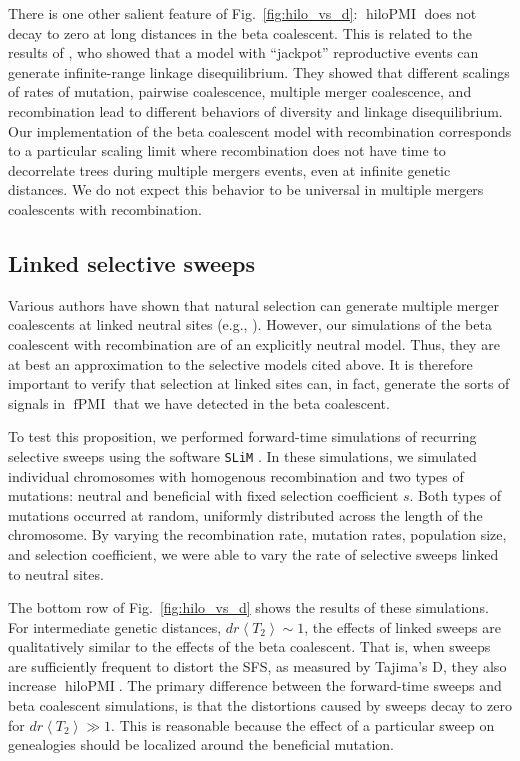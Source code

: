 \documentclass[11pt, letterpaper]{article}   	%
\newcommand{\fig}[1]{Fig.~\ref{#1}}
\newcommand{\E}[1]{\left< #1 \right>}
\DeclareMathOperator{\fpmi}{fPMI}
\DeclareMathOperator{\hilopmi}{hiloPMI}
\begin{document}
There is one other salient feature of \fig{fig:hilo_vs_d}: $\hilopmi$ does not decay to zero at long distances in the beta coalescent.
This is related to the results of \cite{EldonWakeley20??}, who showed that a model with ``jackpot'' reproductive events can generate infinite-range linkage disequilibrium.
They showed that different scalings of rates of mutation, pairwise coalescence, multiple merger coalescence, and recombination lead to different behaviors of diversity and linkage disequilibrium.
Our implementation of the beta coalescent model with recombination corresponds to a particular scaling limit where recombination does not have time to decorrelate trees during multiple mergers events, even at infinite genetic distances.
We do not expect this behavior to be universal in multiple mergers coalescents with recombination.

\subsection*{Linked selective sweeps}

Various authors have shown that natural selection can generate multiple merger coalescents at linked neutral sites (e.g., \cite{DurrettSchweinsberg2005, CoopRalph, NeherHallatscheck2013, DesaiEtAl, Seger}).
However, our simulations of the beta coalescent with recombination are of an explicitly neutral model.
Thus, they are at best an approximation to the selective models cited above.
It is therefore important to verify that selection at linked sites can, in fact, generate the sorts of signals in $\fpmi$ that we have detected in the beta coalescent.

To test this proposition, we performed forward-time simulations of recurring selective sweeps using the software \texttt{SLiM} \autocite{MesserEtAl201?}.
In these simulations, we simulated individual chromosomes with homogenous recombination and two types of mutations: neutral and beneficial with fixed selection coefficient $s$.
Both types of mutations occurred at random, uniformly distributed across the length of the chromosome.
By varying the recombination rate, mutation rates, population size, and selection coefficient, we were able to vary the rate of selective sweeps linked to neutral sites.

The bottom row of \fig{fig:hilo_vs_d} shows the results of these simulations.
For intermediate genetic distances, $d r \E{T_2} \sim 1$, the effects of linked sweeps are qualitatively similar to the effects of the beta coalescent.
That is, when sweeps are sufficiently frequent to distort the SFS, as measured by Tajima's D, they also increase $\hilopmi$.
The primary difference between the forward-time sweeps and beta coalescent simulations, is that the distortions caused by sweeps decay to zero for $d r \E{T_2} \gg 1$.
This is reasonable because the effect of a particular sweep on genealogies should be localized around the beneficial mutation.
\end{document}
